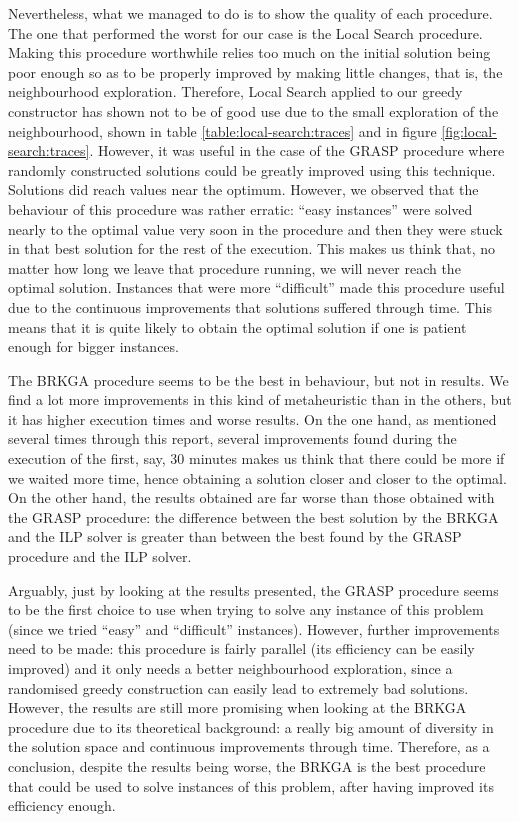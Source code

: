 \hfill

Nevertheless, what we managed to do is to show the quality of each procedure. The one that
performed the worst for our case is the Local Search procedure. Making this procedure worthwhile
relies too much on the initial solution being poor enough so as to be properly improved by
making little changes, that is, the neighbourhood exploration. Therefore, Local Search applied
to our greedy constructor has shown not to be of good use due to the small exploration of the
neighbourhood, shown in table \ref{table:local-search:traces} and in figure
\ref{fig:local-search:traces}. However, it was useful in the case of the GRASP procedure where
randomly constructed solutions could be greatly improved using this technique. Solutions did
reach values near the optimum. However, we observed that the behaviour of this procedure was
rather erratic: ``easy instances'' were solved nearly to the optimal value very soon in the
procedure and then they were stuck in that best solution for the rest of the execution. This
makes us think that, no matter how long we leave that procedure running, we will never reach the
optimal solution. Instances that were more ``difficult'' made this procedure useful due to the
continuous improvements that solutions suffered through time. This means that it is quite likely
to obtain the optimal solution if one is patient enough for bigger instances.

\hfill

The BRKGA procedure seems to be the best in behaviour, but not in results. We find a lot more
improvements in this kind of metaheuristic than in the others, but it has higher execution
times and worse results. On the one hand, as mentioned several times through this report,
several improvements found during the execution of the first, say, 30 minutes makes us think
that there could be more if we waited more time, hence obtaining a solution closer and closer
to the optimal. On the other hand, the results obtained are far worse than those obtained with
the GRASP procedure: the difference between the best solution by the BRKGA and the ILP solver
is greater than between the best found by the GRASP procedure and the ILP solver.

\hfill

Arguably, just by looking at the results presented, the GRASP procedure seems to be the first
choice to use when trying to solve any instance of this problem (since we tried ``easy'' and
``difficult'' instances). However, further improvements need to be made: this procedure is
fairly parallel (its efficiency can be easily improved) and it only needs a better neighbourhood
exploration, since a randomised greedy construction can easily lead to extremely bad solutions.
However, the results are still more promising when looking at the BRKGA procedure due to its
theoretical background: a really big amount of diversity in the solution space and continuous
improvements through time. Therefore, as a conclusion, despite the results being worse, the
BRKGA is the best procedure that could be used to solve instances of this problem, after having
improved its efficiency enough.


